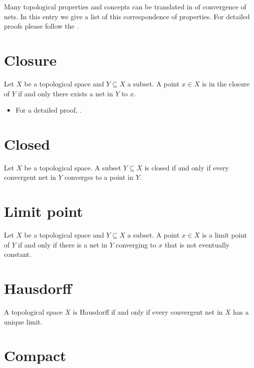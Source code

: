 \documentclass[12pt]{article}
\begin{document}

Many topological properties and concepts can be translated in  of convergence of nets. In this entry we give a list of this correspondence of properties. For detailed proofs please follow the .

\section{Closure}

Let $X$ be a topological space and $Y \subseteq X$ a subset. A point $x \in X$ is in the closure of $Y$ if and only there exists a net in $Y$  to $x$.

\begin{itemize}
\item For a detailed proof, .
\end{itemize}

\section{Closed}

Let $X$ be a topological space. A subset $Y \subseteq X$ is closed if and only if every convergent net in $Y$ converges to a point in $Y$.

\section{Limit point}

Let $X$ be a topological space and $Y \subseteq X$ a subset. A point $x \in X$ is a limit point of $Y$ if and only if there is a net in $Y$ converging to $x$ that is not eventually constant.

\section{Hausdorff}

A topological space $X$ is Hausdorff if and only if every convergent net in $X$ has a unique limit.

\section{Compact}
\end{document}
